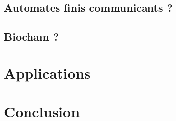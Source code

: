 \documentclass[a4paper]{report}
\begin{document}
  \section{Automates finis communicants ?}
  \section{Biocham ?}

\chapter{Applications}

\chapter{Conclusion}
\end{document}
